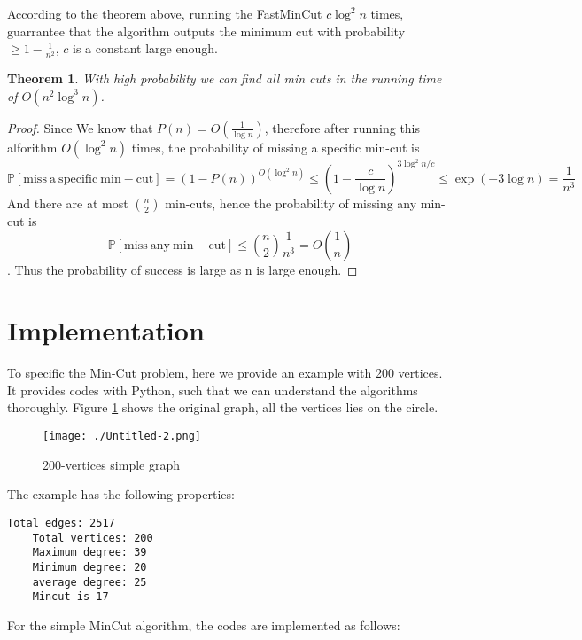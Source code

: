 \documentclass[11pt]{article}
\theoremstyle{plain}
\newtheorem{thm}{Theorem}[section]
\theoremstyle{definition}
\theoremstyle{remark}
\begin{document}
	According to the theorem above, running the FastMinCut $ c\log^2 n $ times, guarrantee that the algorithm outputs the minimum cut with probability $ \geq 1-\frac{1}{n^2} $, $ c $ is a constant large enough.

	\begin{thm}
	With high probability we can find all min cuts in the running time of $ O(n^2 \log^3n) $.
	\end{thm}
	\begin{proof}
	Since We know that $ P(n)=O(\frac{1}{\log n}) $, therefore after running this alforithm $ O(\log^2 n) $ times, the probability of missing a specific min-cut is \[ \mathbb{P}[\mathrm{miss\ a\ specific\ min-cut}]=(1-P(n))^{O(\log^2n)} \leq (1-\frac{c}{\log n})^{3\log^2 n/c} \leq \exp(-3\log n) = \frac{1}{n^3} \]
	And there are at most $ {n \choose 2} $ min-cuts, hence the probability of missing any min-cut is\[ \mathbb{P}[\mathrm{miss\ any\ min-cut}] \leq {n \choose 2}\frac{1}{n^3} = O(\frac{1}{n}) \].
	Thus the probability of success is large as n is large enough.
	\end{proof}


\section{Implementation}

To specific the Min-Cut problem, here we provide an example with 200 vertices. It provides codes with Python, such that we can understand the algorithms thoroughly. Figure \ref{fig:200-vertices simple graph} shows the original graph, all the vertices lies on the circle.
	
	\begin{figure}[h]
	\centering
	\texttt{[image: ./Untitled-2.png]}
	\caption{200-vertices simple graph}
	\label{fig:200-vertices simple graph}
	\end{figure}
\newpage
The example has the following properties:
\begin{center}
\begin{Verbatim}[frame = single]
	Total edges: 2517
	Total vertices: 200
	Maximum degree: 39
	Minimum degree: 20
	average degree: 25
	Mincut is 17
\end{Verbatim}
\end{center}

For the simple MinCut algorithm, the codes are implemented as follows: 
\end{document}
